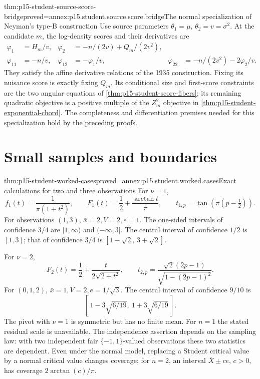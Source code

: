 \begin{hblemma}{thm:p15-student-source-score-bridge}{proved=annex:p15.student.source.score.bridge}{The normal specialization of Neyman's type-B construction}
Use source parameters \(\theta_1=\mu\), \(\theta_2=v=\sigma^2\).
At the candidate \(m\), the log-density scores and their
derivatives are
\[
\begin{aligned}
 \varphi_1&=H_m/v,&
 \varphi_2&=-n/(2v)+Q_m/(2v^2),\\
 \varphi_{11}&=-n/v,&
 \varphi_{12}&=-\varphi_1/v,&
 \varphi_{22}&=-n/(2v^2)-2\varphi_2/v.
\end{aligned}
\]
They satisfy the affine derivative relations of the 1935
construction. Fixing its nuisance score is exactly fixing
\(Q_m\). Its conditional size and first-score constraints
are the two angular equations of
\cref{thm:p15-student-score-fibers}; its remaining quadratic
objective is a positive multiple of the \(Z_m^2\) objective
in \cref{thm:p15-student-exponential-chord}.
The completeness and differentiation premises needed for this
specialization hold by the preceding proofs.
\end{hblemma}

\section{Small samples and boundaries}

\begin{hbtheorem}{thm:p15-student-worked-cases}{proved=annex:p15.student.worked.cases}{Exact calculations for two and three observations}
For \(\nu=1\),
\[
 f_1(t)=\frac1{\pi(1+t^2)},\qquad
 F_1(t)=\frac12+\frac{\arctan t}{\pi},\qquad
 t_{1,p}=\tan\!\left(\pi(p-\tfrac12)\right).
\]
For observations \((1,3)\), \(\bar x=2,V=2,e=1\).
The one-sided intervals of confidence \(3/4\) are
\([1,\infty)\) and \((-\infty,3]\).
The central interval of confidence \(1/2\) is \([1,3]\);
that of confidence \(3/4\) is
\([1-\sqrt2,\,3+\sqrt2]\).

For \(\nu=2\),
\[
 F_2(t)=\frac12+\frac{t}{2\sqrt{2+t^2}},\qquad
 t_{2,p}=\frac{\sqrt2(2p-1)}{\sqrt{1-(2p-1)^2}}.
\]
For \((0,1,2)\), \(\bar x=1,V=2,e=1/\sqrt3\).
The central interval of confidence \(9/10\) is
\[
                   [\,1-3\sqrt{6/19},\ 1+3\sqrt{6/19}\,].
\]
The pivot with \(\nu=1\) is symmetric but has no finite mean.
For \(n=1\) the stated residual scale is unavailable.
The independence assertion depends on the sampling law:
with two independent fair
\(\{-1,1\}\)-valued observations these two statistics are
dependent. Even under the normal model, replacing a Student
critical value by a normal critical value changes coverage;
for \(n=2\), an interval \(\bar X\pm c e\), \(c>0\), has
coverage \(2\arctan(c)/\pi\).
\end{hbtheorem}
